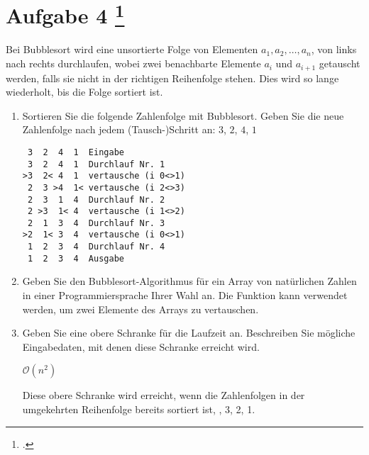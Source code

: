\documentclass{bschlangaul-aufgabe}
\begin{document}
\section{Aufgabe 4
\footcite{examen:46115:2017:03}}

Bei Bubblesort wird eine unsortierte Folge von Elementen $a_1,
a_2,\dots, a_n$, von links nach rechts durchlaufen, wobei zwei
benachbarte Elemente $a_i$ und $a_{i + 1}$ getauscht werden, falls sie
nicht in der richtigen Reihenfolge stehen. Dies wird so lange
wiederholt, bis die Folge sortiert ist.

\begin{enumerate}

\item Sortieren Sie die folgende Zahlenfolge mit Bubblesort. Geben Sie
die neue Zahlenfolge nach jedem (Tausch-)Schritt an: $3$, $2$, $4$, $1$

\begin{liAntwort}
\begin{verbatim}
 3  2  4  1  Eingabe
 3  2  4  1  Durchlauf Nr. 1
>3  2< 4  1  vertausche (i 0<>1)
 2  3 >4  1< vertausche (i 2<>3)
 2  3  1  4  Durchlauf Nr. 2
 2 >3  1< 4  vertausche (i 1<>2)
 2  1  3  4  Durchlauf Nr. 3
>2  1< 3  4  vertausche (i 0<>1)
 1  2  3  4  Durchlauf Nr. 4
 1  2  3  4  Ausgabe
\end{verbatim}
\end{liAntwort}


\item Geben Sie den Bubblesort-Algorithmus für ein Array von natürlichen
Zahlen in einer Programmiersprache Ihrer Wahl an. Die Funktion
 kann verwendet werden, um zwei
Elemente des Arrays zu vertauschen.

\begin{liAntwort}


\end{liAntwort}


\item Geben Sie eine obere Schranke für die Laufzeit an. Beschreiben Sie
mögliche Eingabedaten, mit denen diese Schranke erreicht wird.

\begin{liAntwort}
$\mathcal{O}(n^2)$

Diese obere Schranke wird erreicht, wenn die Zahlenfolgen in der
umgekehrten Reihenfolge bereits sortiert ist, , 3, 2, 1.
\end{liAntwort}

\end{enumerate}
\end{document}
